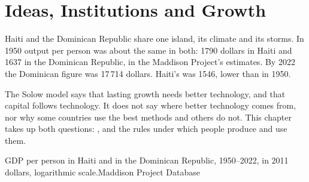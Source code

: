 \chapter{Ideas, Institutions and Growth}\label{ch:g12:ideas-institutions-growth}

Haiti and the Dominican Republic share one island, its climate and its storms. In 1950 output per person was about the same in both: 1790 dollars in Haiti and 1637 in the
Dominican Republic, in the Maddison Project's estimates. By 2022 the Dominican figure was 17\,714 dollars. Haiti's was 1546, lower than in 1950.

The Solow model says that lasting growth needs better technology, and that capital follows technology. It does not say where better technology comes from, nor why some
countries use the best methods and others do not. This chapter takes up both questions: , and the rules under which people produce and use them.

\begin{openingchart}{GDP per person in Haiti and in the Dominican Republic, 1950--2022, in 2011 dollars, logarithmic scale.}{Maddison Project Database}
\end{openingchart}

